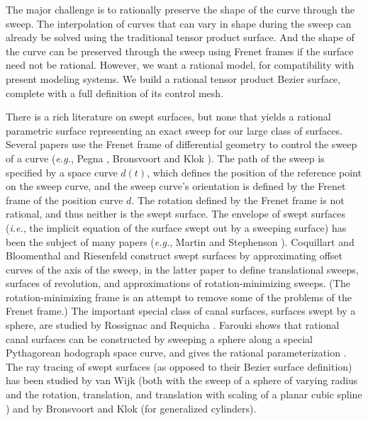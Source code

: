 The major challenge is to rationally preserve the shape of the curve 
through the sweep.
The interpolation of curves that can vary in shape during the sweep
can already be solved using the traditional tensor product surface.
And the shape of the curve can be preserved through the sweep
using Frenet frames if the surface need not be rational.
However, we want a rational model, for compatibility with 
present modeling systems.
We build a rational tensor product Bezier surface, complete with a full
definition of its control mesh.

There is a rich literature on swept surfaces, but none
that yields a rational parametric surface
representing an exact sweep for our large class of surfaces.
Several papers use the Frenet frame of differential geometry
to control the sweep of a curve ({\em e.g.}, Pegna \cite{Pegna88},
Bronsvoort and Klok \cite{bronsklok85}).
The path of the sweep is specified by a space curve $d(t)$,
which defines the position of the reference point on the
sweep curve, and the sweep curve's orientation is defined by
the Frenet frame of the position curve $d$.
The rotation defined by the Frenet frame is not rational,
and thus neither is the swept surface.  %
The envelope of swept surfaces ({\em i.e.}, the implicit equation of the surface
swept out by a sweeping surface) has been the subject of many papers
({\em e.g.}, Martin and Stephenson \cite{martinsteph90}).
Coquillart \cite{coquillart87} and Bloomenthal and Riesenfeld 
\cite{bloom91} construct swept surfaces by approximating offset curves
of the axis of the sweep, in the latter paper to define translational sweeps,
surfaces of revolution, and approximations of rotation-minimizing 
sweeps.
(The rotation-minimizing frame 
is an attempt to remove some of the problems of the Frenet frame.)
The important special class of canal surfaces, 
surfaces swept by a sphere, are studied by Rossignac and Requicha 
\cite{rossignac85,rossrequicha84}.
Farouki shows that rational canal surfaces can be constructed by sweeping
a sphere along a special Pythagorean hodograph space curve, and gives the
rational parameterization \cite{farouki94}.
The ray tracing of swept surfaces (as opposed to their Bezier surface 
definition) has been studied by van Wijk (both with the sweep of a sphere
of varying radius \cite{vanwijk84euro} and the rotation, translation,
and translation with scaling of a planar cubic spline \cite{vanwijk84tog})
and by Bronsvoort and Klok \cite{bronsklok85} (for generalized cylinders).

